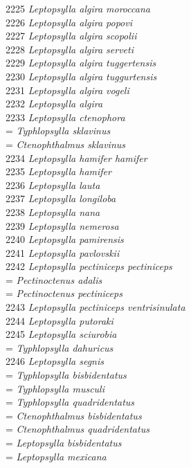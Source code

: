 \documentclass[
]{article}
\begin{document}
2225 \emph{Leptopsylla algira moroccana}\\
2226 \emph{Leptopsylla algira popovi}\\
2227 \emph{Leptopsylla algira scopolii}\\
2228 \emph{Leptopsylla algira serveti}\\
2229 \emph{Leptopsylla algira tuggertensis}\\
2230 \emph{Leptopsylla algira tuggurtensis}\\
2231 \emph{Leptopsylla algira vogeli}\\
2232 \emph{Leptopsylla algira}\\
2233 \emph{Leptopsylla ctenophora}\\
= \emph{Typhlopsylla sklavinus}\\
= \emph{Ctenophthalmus sklavinus}\\
2234 \emph{Leptopsylla hamifer hamifer}\\
2235 \emph{Leptopsylla hamifer}\\
2236 \emph{Leptopsylla lauta}\\
2237 \emph{Leptopsylla longiloba}\\
2238 \emph{Leptopsylla nana}\\
2239 \emph{Leptopsylla nemerosa}\\
2240 \emph{Leptopsylla pamirensis}\\
2241 \emph{Leptopsylla pavlovskii}\\
2242 \emph{Leptopsylla pectiniceps pectiniceps}\\
= \emph{Pectinoctenus adalis}\\
= \emph{Pectinoctenus pectiniceps}\\
2243 \emph{Leptopsylla pectiniceps ventrisinulata}\\
2244 \emph{Leptopsylla putoraki}\\
2245 \emph{Leptopsylla sciurobia}\\
= \emph{Typhlopsylla dahuricus}\\
2246 \emph{Leptopsylla segnis}\\
= \emph{Typhlopsylla bisbidentatus}\\
= \emph{Typhlopsylla musculi}\\
= \emph{Typhlopsylla quadridentatus}\\
= \emph{Ctenophthalmus bisbidentatus}\\
= \emph{Ctenophthalmus quadridentatus}\\
= \emph{Leptopsylla bisbidentatus}\\
= \emph{Leptopsylla mexicana}\\
\end{document}
